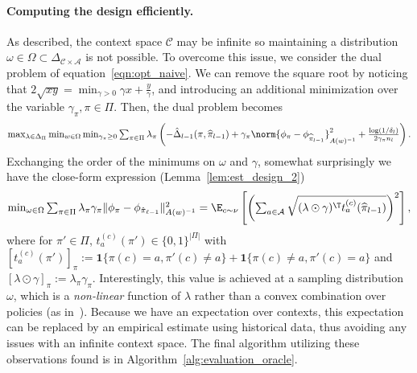 \documentclass{article}
\newcommand{\mc}[1]{\mathcal{#1}}
\newcommand{\kevin}[1]{\textcolor{red}{KGJ:#1}}
\newcommand{\pill}{\widehat{\pi}_{l-1}}
\newcommand{\1}{\mathbf{1}}
\begin{document}
\paragraph{Computing the design efficiently.} As described, the context space $\mc{C}$ may be infinite so maintaining a distribution $\omega\in \Omega \subset \Delta_{\mc{C}\times \mc{A}}$ is not possible. To overcome this issue, we consider the dual problem of equation~\eqref{eqn:opt_naive}. 
We can remove the square root by noticing that $2\sqrt{x y} = \min_{\gamma > 0 } \gamma x + \frac{y}{\gamma}$, and introducing an additional minimization over the variable $\gamma_{\pi} ,\pi\in \Pi$. Then, the dual problem becomes
\begin{equation}\label{eqn:dual_naive}
    \textstyle\max_{\lambda\in\Delta_\Pi}\min_{w\in\Omega}\min_{\gamma_\pi\geq 0}\sum_{\pi\in\Pi}\lambda_\pi\left(-\hat{\Delta}_{l-1}(\pi,\pill)+\gamma_{\pi} \norm{\phi_{\pi}-\phi_{\pill}}_{A(w)^{-1}}^2 +  \frac{\log(1/\delta_l)}{2 \gamma_{\pi}n_l}\right). 
\end{equation}
Exchanging the order of the minimums on $\omega$ and $\gamma$, somewhat surprisingly we have the close-form expression (Lemma~\ref{lem:est_design_2})
\begin{equation*}
    \textstyle\min_{\omega\in \Omega} \sum_{\pi\in\Pi} \lambda_\pi \gamma_\pi \|\phi_{\pi} - \phi_{\hat{\pi}_{\ell-1}}\|_{A(w)^{-1}}^2 = \E_{c\sim \nu}\left[\left(\sum_{a\in \mathcal{A}}\sqrt{(\lambda\odot \gamma)^\T t_a^{(c)}(\pill) }\right)^2\right],
\end{equation*}
where for $\pi'\in\Pi$, $t_{a}^{(c)}(\pi') \in \{0,1\}^{|\Pi|}$ with  $[t_{a}^{(c)}(\pi')]_\pi:=\1\{\pi(c)=a,\pi'(c)\ne a\}+\1\{\pi(c)\ne a,\pi'(c)=a\}$  and $[\lambda\odot\gamma]_\pi := \lambda_\pi \gamma_\pi$.
Interestingly, this value is achieved at a sampling distribution $\omega$, which is a \textit{non-linear} function of $\lambda$ rather than a convex combination over policies (as in~\cite{agarwal2014taming}). 
Because we have an expectation over contexts, this expectation can be replaced by an empirical estimate using historical data, thus avoiding any issues with an infinite context space.
The final algorithm utilizing these observations found is in Algorithm~\ref{alg:evaluation_oracle}.
\end{document}
